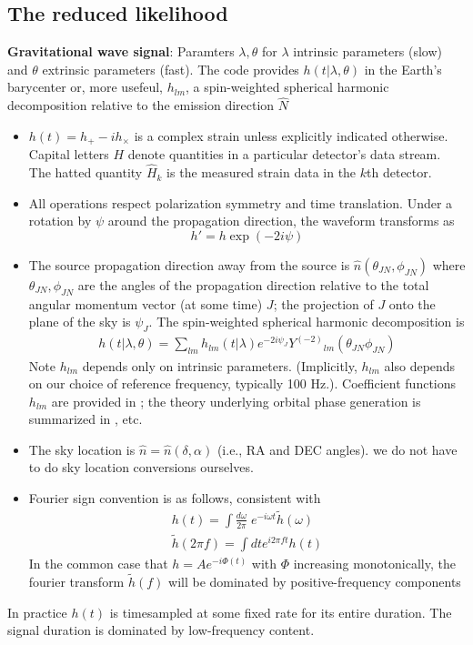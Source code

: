 \documentclass[twocolumn,prd,nofootinbib]{revtex4}
\newcommand\Y[1]{Y^{(#1)}{}}
\begin{document}
\subsection{The reduced likelihood}
\noindent \textbf{Gravitational wave signal}: Paramters $\lambda,\theta$ for $\lambda$ intrinsic parameters (slow) and
$\theta$ extrinsic parameters (fast).  The code provides $h(t|\lambda,\theta)$ in the Earth's barycenter or, more
usefeul, $h_{lm}$, a spin-weighted spherical harmonic decomposition relative to the emission direction $\hat{N}$
\begin{shaded}
\begin{itemize}
\item $h(t)=h_+-i h_\times$ is a complex strain unless explicitly indicated otherwise.   Capital letters $H$ denote
  quantities in a particular detector's data stream.  The hatted quantity $\hat{H}_k$ is the measured strain data in the
  $k$th detector.
\item All operations respect polarization symmetry and time translation.  Under a rotation by $\psi$ around the
  propagation direction, the waveform transforms as
\[
h' = h \exp(-2i \psi)
\]
\item The source propagation direction away from the source is $\hat{n}(\theta_{JN},\phi_{JN})$ where
  $\theta_{JN},\phi_{JN}$ are the angles of the propagation direction relative to the total angular momentum vector (at
  some time) $J$; the projection of $J$
  onto the plane of the sky is $\psi_J$.  The spin-weighted
  spherical harmonic decomposition is 
\begin{eqnarray}
\label{eq:def:hSpinWeightEmissionDirection}
h(t|\lambda,\theta) = \sum_{lm} h_{lm}(t|\lambda) e^{-2i\psi_J}\Y{-2}_{lm}(\theta_{JN}\phi_{JN})
\end{eqnarray}
Note $h_{lm}$ depends only on intrinsic parameters.  (Implicitly, $h_{lm}$ also depends on our choice of reference
frequency, typically 100 Hz.).  Coefficient functions $h_{lm}$ are provided in
\cite{gw-astro-mergers-approximations-SpinningPNHigherHarmonics}; the theory underlying orbital phase generation is
summarized in  \cite{gw-astro-PN-Comparison-AlessandraSathya2009}, etc.
\item The sky location is $\hat{n}=\hat{n}(\delta,\alpha)$ (i.e., RA and DEC angles).  we do not have to do sky location
  conversions ourselves.
\item Fourier sign convention is as follows, consistent with \cite{gwastro-mergers-nr-Alignment-ROS-Polarization}
\begin{eqnarray}
h(t) = \int \frac{d \omega}{2\pi} \; e^{-i\omega t} \tilde{h}(\omega) \\
\tilde{h}(2\pi f) = \int dt e^{i 2\pi f t} h(t)
\end{eqnarray}
In the common case that  $h = Ae^{-i\Phi(t)}$ with $\Phi$ increasing monotonically, the fourier transform $\tilde{h}(f)$ will be dominated by
positive-frequency components
\end{itemize}
In practice $h(t)$ is timesampled at some fixed rate for its entire duration.  The signal duration is dominated by
low-frequency content.
\end{shaded}
\end{document}
